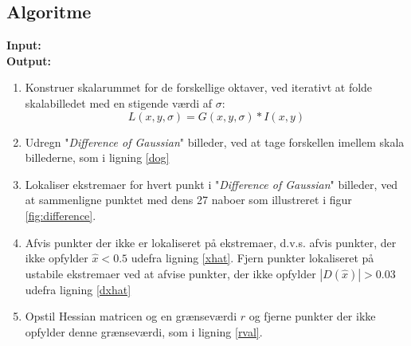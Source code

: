 \subsection*{Algoritme}
\textbf{Input:} \\
\textbf{Output:}
\begin{enumerate}
\item{Konstruer skalarummet for de forskellige oktaver, ved iterativt at folde skalabilledet med en stigende værdi af $\sigma$: $$ L(x,y,\sigma)= G(x,y,\sigma) \ast I(x,y) $$}
\item{Udregn "\textit{Difference of Gaussian}" billeder, ved at tage forskellen imellem skala billederne, som i ligning \eqref{dog}}
\item{Lokaliser ekstremaer for hvert punkt i "\textit{Difference of Gaussian}" billeder, ved at sammenligne punktet med dens 27 naboer som illustreret i figur \ref{fig:difference}.}
\item{Afvis punkter der ikke er lokaliseret på ekstremaer, d.v.s. afvis punkter, der ikke opfylder $\hat{x}<0.5$ udefra ligning \eqref{xhat}.
Fjern punkter lokaliseret på ustabile ekstremaer ved at afvise punkter, der ikke opfylder $ |D(\hat{x})|>0.03 $ udefra ligning \eqref{dxhat}}
\item{Opstil Hessian matricen og en grænseværdi $r$ og fjerne punkter der ikke opfylder denne grænseværdi, som i ligning \eqref{rval}.}
\end{enumerate}